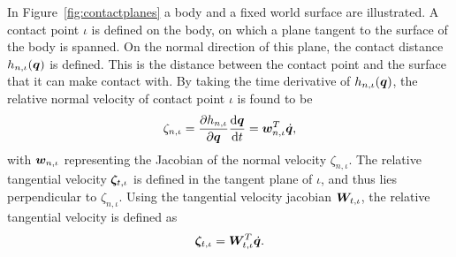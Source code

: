 \documentclass[../DC2017114Bouma.tex]{subfiles}
\begin{document}
In Figure~\ref{fig:contactplanes} a body and a fixed world surface are illustrated. A contact point $\iota$ is defined on the body, on which a plane tangent to the surface of the body is spanned. On the normal direction of this plane, the contact distance $h_{n,\iota}({\boldsymbol{q}})$ is defined. This is the distance between the contact point and the surface that it can make contact with. By taking the time derivative of $h_{n,\iota}({\boldsymbol{q}})$, the relative normal velocity of contact point $\iota$ is found to be
\begin{align}
\zeta_{n,\iota} = \frac{\partial h_{n,\iota}}{\partial{\boldsymbol{q}}}\frac{\text{d}{\boldsymbol{q}}}{\text{d} t} = {\boldsymbol{w}}_{n,\iota}^T\dot{{\boldsymbol{q}}},
\end{align}
%
%
%
%
%
%
%
%
%
%
%
%
%
%
%
%
%
%
%
%
with ${\boldsymbol{w}}_{n,\iota}$ representing the Jacobian of the normal velocity $\zeta_{n,\iota}$. The relative tangential velocity $\boldsymbol{\zeta}_{t,\iota}$ is defined in the tangent plane of $\iota$, and thus lies perpendicular to $\zeta_{n,\iota}$. Using the tangential velocity jacobian ${\boldsymbol{W}}_{t,\iota}$, the relative tangential velocity is defined as
\begin{align}
\boldsymbol{\zeta}_{t,\iota} = {\boldsymbol{W}}_{t,\iota}^T\dot{{\boldsymbol{q}}}.
\end{align}
\end{document}
